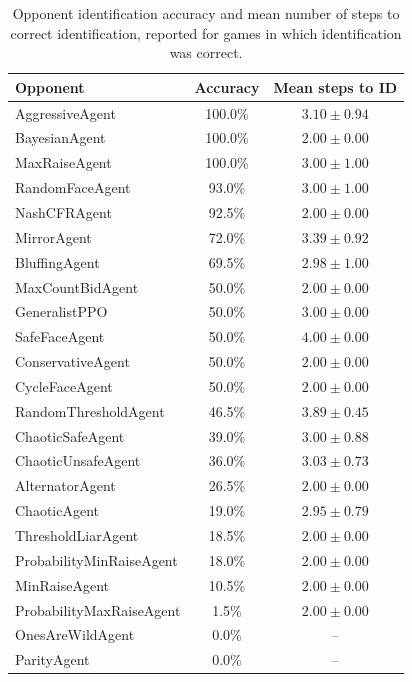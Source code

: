 \begin{table}[t]
\centering
\scriptsize
\begin{tabular}{lcc}
\toprule
Opponent & Accuracy & Mean steps to ID \\
\midrule
AggressiveAgent & 100.0\% & $3.10 \pm 0.94$ \\
BayesianAgent & 100.0\% & $2.00 \pm 0.00$ \\
MaxRaiseAgent & 100.0\% & $3.00 \pm 1.00$ \\
RandomFaceAgent & 93.0\% & $3.00 \pm 1.00$ \\
NashCFRAgent & 92.5\% & $2.00 \pm 0.00$ \\
MirrorAgent & 72.0\% & $3.39 \pm 0.92$ \\
BluffingAgent & 69.5\% & $2.98 \pm 1.00$ \\
MaxCountBidAgent & 50.0\% & $2.00 \pm 0.00$ \\
GeneralistPPO & 50.0\% & $3.00 \pm 0.00$ \\
SafeFaceAgent & 50.0\% & $4.00 \pm 0.00$ \\
ConservativeAgent & 50.0\% & $2.00 \pm 0.00$ \\
CycleFaceAgent & 50.0\% & $2.00 \pm 0.00$ \\
RandomThresholdAgent & 46.5\% & $3.89 \pm 0.45$ \\
ChaoticSafeAgent & 39.0\% & $3.00 \pm 0.88$ \\
ChaoticUnsafeAgent & 36.0\% & $3.03 \pm 0.73$ \\
AlternatorAgent & 26.5\% & $2.00 \pm 0.00$ \\
ChaoticAgent & 19.0\% & $2.95 \pm 0.79$ \\
ThresholdLiarAgent & 18.5\% & $2.00 \pm 0.00$ \\
ProbabilityMinRaiseAgent & 18.0\% & $2.00 \pm 0.00$ \\
MinRaiseAgent & 10.5\% & $2.00 \pm 0.00$ \\
ProbabilityMaxRaiseAgent & 1.5\% & $2.00 \pm 0.00$ \\
\midrule
OnesAreWildAgent & 0.0\% & -- \\
ParityAgent & 0.0\% & -- \\
\bottomrule
\end{tabular}
\caption{Opponent identification accuracy and mean number of steps to correct identification, reported for games in which identification was correct.}
\label{tab:app_adaptive_identification}
\end{table}

